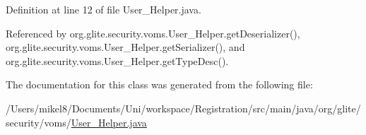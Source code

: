Definition at line 12 of file User\_\-Helper.java.



Referenced by org.glite.security.voms.User\_\-Helper.getDeserializer(), org.glite.security.voms.User\_\-Helper.getSerializer(), and org.glite.security.voms.User\_\-Helper.getTypeDesc().



The documentation for this class was generated from the following file:\begin{DoxyCompactItemize}
\item 
/Users/mikel8/Documents/Uni/workspace/Registration/src/main/java/org/glite/security/voms/\hyperlink{User__Helper_8java}{User\_\-Helper.java}\end{DoxyCompactItemize}
